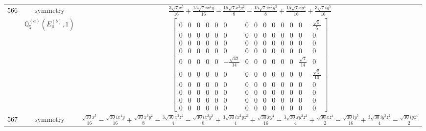\documentclass[fleqn,8pt,landscape]{jsarticle}
\begin{document}
\begin{longtable}{ccc}
$ 566 $ & $ \text{symmetry} $ & $ \frac{3 \sqrt{7} x^{5}}{16} + \frac{15 \sqrt{7} i x^{4} y}{16} - \frac{15 \sqrt{7} x^{3} y^{2}}{8} - \frac{15 \sqrt{7} i x^{2} y^{3}}{8} + \frac{15 \sqrt{7} x y^{4}}{16} + \frac{3 \sqrt{7} i y^{5}}{16} $ \\
$  $ & $ \mathbb{Q}_{5}^{(a)}(E_{u}^{(b)},1) $ & $ \begin{bmatrix} 0 & 0 & 0 & 0 & 0 & 0 & 0 & 0 & 0 & 0 & 0 & 0 & 0 & \frac{\sqrt{5}}{5} \\ 0 & 0 & 0 & 0 & 0 & 0 & 0 & 0 & 0 & 0 & 0 & 0 & 0 & 0 \\ 0 & 0 & 0 & 0 & 0 & 0 & 0 & 0 & 0 & 0 & 0 & 0 & 0 & 0 \\ 0 & 0 & 0 & 0 & 0 & 0 & 0 & 0 & 0 & 0 & 0 & 0 & 0 & 0 \\ 0 & 0 & 0 & 0 & 0 & - \frac{\sqrt{42}}{14} & 0 & 0 & 0 & 0 & 0 & 0 & \frac{\sqrt{7}}{14} & 0 \\ 0 & 0 & 0 & 0 & 0 & 0 & 0 & 0 & 0 & 0 & 0 & 0 & 0 & \frac{\sqrt{5}}{10} \\ 0 & 0 & 0 & 0 & 0 & 0 & 0 & 0 & 0 & 0 & 0 & 0 & 0 & 0 \\ 0 & 0 & 0 & 0 & 0 & 0 & 0 & 0 & 0 & 0 & 0 & 0 & 0 & 0 \\ 0 & 0 & 0 & 0 & 0 & 0 & 0 & 0 & 0 & 0 & 0 & 0 & 0 & 0 \\ 0 & 0 & 0 & 0 & 0 & 0 & 0 & 0 & 0 & 0 & 0 & 0 & 0 & 0 \end{bmatrix} $ \\ \hline
$ 567 $ & $ \text{symmetry} $ & $ \frac{\sqrt{30} x^{5}}{16} - \frac{\sqrt{30} i x^{4} y}{16} + \frac{\sqrt{30} x^{3} y^{2}}{8} - \frac{3 \sqrt{30} x^{3} z^{2}}{4} - \frac{\sqrt{30} i x^{2} y^{3}}{8} + \frac{3 \sqrt{30} i x^{2} y z^{2}}{4} + \frac{\sqrt{30} x y^{4}}{16} - \frac{3 \sqrt{30} x y^{2} z^{2}}{4} + \frac{\sqrt{30} x z^{4}}{2} - \frac{\sqrt{30} i y^{5}}{16} + \frac{3 \sqrt{30} i y^{3} z^{2}}{4} - \frac{\sqrt{30} i y z^{4}}{2} $ \\

\end{longtable}
\end{document}
